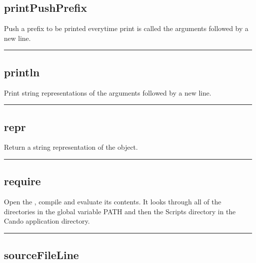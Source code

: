 \begin{itemize}
\subsection{printPushPrefix}
  \par

  Push a prefix to be printed everytime print is called the arguments followed by a new line.

\rule{6in}{0.01cm}\par
{}\par
\subsection{println}
  \par

  Print string representations of the arguments followed by a new line.

\rule{6in}{0.01cm}\par
{}\par
\subsection{repr}

  Return a string representation of the object.

\rule{6in}{0.01cm}\par
{}\par
\subsection{require}

  Open the , compile and evaluate its contents.
  It looks through all of the directories in the global variable PATH and then 
  the Scripts directory in the Cando application directory.


\rule{6in}{0.01cm}\par
{}\par
\subsection{sourceFileLine}


\end{itemize}
